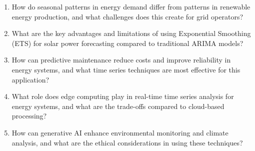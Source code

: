 \begin{enumerate}
\item How do seasonal patterns in energy demand differ from patterns in renewable energy production, and what challenges does this create for grid operators?

\item What are the key advantages and limitations of using Exponential Smoothing (ETS) for solar power forecasting compared to traditional ARIMA models?

\item How can predictive maintenance reduce costs and improve reliability in energy systems, and what time series techniques are most effective for this application?

\item What role does edge computing play in real-time time series analysis for energy systems, and what are the trade-offs compared to cloud-based processing?

\item How can generative AI enhance environmental monitoring and climate analysis, and what are the ethical considerations in using these techniques?
\end{enumerate}

